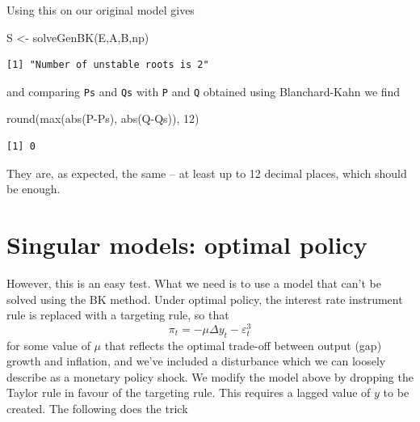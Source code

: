 \documentclass[
  letterpaper,
]{book}
\newenvironment{Shaded}{\begin{snugshade}}{\end{snugshade}}
\newcommand{\DecValTok}[1]{\textcolor[rgb]{0.68,0.00,0.00}{#1}}
\newcommand{\FunctionTok}[1]{\textcolor[rgb]{0.28,0.35,0.67}{#1}}
\newcommand{\NormalTok}[1]{\textcolor[rgb]{0.00,0.23,0.31}{#1}}
\newcommand{\OtherTok}[1]{\textcolor[rgb]{0.00,0.23,0.31}{#1}}
\newcommand{\SpecialCharTok}[1]{\textcolor[rgb]{0.37,0.37,0.37}{#1}}
\begin{document}
Using this on our original model gives

\begin{Shaded}
\begin{Highlighting}[]
\NormalTok{S  }\OtherTok{\textless{}{-}} \FunctionTok{solveGenBK}\NormalTok{(E,A,B,np)}
\end{Highlighting}
\end{Shaded}

\begin{verbatim}
[1] "Number of unstable roots is 2"
\end{verbatim}

\begin{Shaded}
\end{Shaded}

and comparing \texttt{Ps} and \texttt{Qs} with \texttt{P} and \texttt{Q}
obtained using Blanchard-Kahn we find

\begin{Shaded}
\begin{Highlighting}[]
\FunctionTok{round}\NormalTok{(}\FunctionTok{max}\NormalTok{(}\FunctionTok{abs}\NormalTok{(P}\SpecialCharTok{{-}}\NormalTok{Ps), }\FunctionTok{abs}\NormalTok{(Q}\SpecialCharTok{{-}}\NormalTok{Qs)), }\DecValTok{12}\NormalTok{)}
\end{Highlighting}
\end{Shaded}

\begin{verbatim}
[1] 0
\end{verbatim}

They are, as expected, the same -- at least up to 12 decimal places,
which should be enough.

\hypertarget{singular-models-optimal-policy}{%
\section{Singular models: optimal
policy}\label{singular-models-optimal-policy}}

However, this is an easy test. What we need is to use a model that can't
be solved using the BK method. Under optimal policy, the interest rate
instrument rule is replaced with a targeting rule, so that \[
  \pi_t = -\mu \Delta y_t - \varepsilon^3_t
\] for some value of \(\mu\) that reflects the optimal trade-off between
output (gap) growth and inflation, and we've included a disturbance
which we can loosely describe as a monetary policy shock. We modify the
model above by dropping the Taylor rule in favour of the targeting rule.
This requires a lagged value of \(y\) to be created. The following does
the trick
\end{document}
